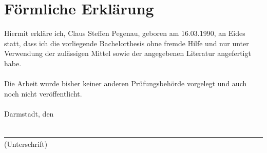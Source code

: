 %
%
%
%

\section*{Förmliche Erklärung}
Hiermit erkläre ich, Claus Steffen Pegenau, geboren am 16.03.1990, an Eides 
statt, dass ich die vorliegende Bachelorthesis ohne 
fremde Hilfe und nur unter Verwendung der zulässigen Mittel sowie der 
angegebenen Literatur angefertigt habe.
\\
\\
Die Arbeit wurde bisher keiner anderen Prüfungsbehörde vorgelegt und auch noch
nicht veröffentlicht.
\\
\vspace*{4.5cm}
\\

\noindent Darmstadt, den \abgabedatum
\\
\vspace*{3.5cm}\\
\underline{~~~~~~~~~~~~~~~~~~~~~~~~~~~~~~~~~~~~~~~~~~~~~~~~~~~~~~~~~~~~~~~~~~~~~~~~}\\(Unterschrift)
\normalsize



